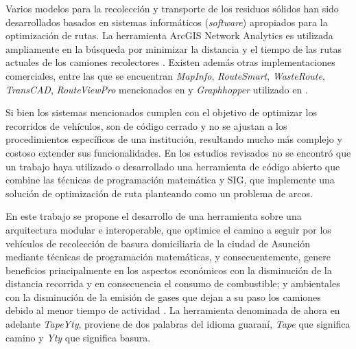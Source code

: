 


Varios modelos para la recolección y transporte de los residuos sólidos han sido desarrollados basados en sistemas informáticos (\textit{software}) apropiados para la optimización de rutas. La herramienta ArcGIS Network Analytics es utilizada ampliamente en la búsqueda por minimizar la distancia y el tiempo de las rutas actuales de los camiones recolectores \citep{Kallel2016UsingTunisia,Malakahmad2014SolidMalaysia}. Existen además otras implementaciones comerciales, entre las que se encuentran \textit{MapInfo}, \textit{RouteSmart}, \textit{WasteRoute}, \textit{TransCAD}, \textit{RouteViewPro} mencionados en \citet{Kallel2016UsingTunisia} y \textit{Graphhopper} utilizado en \citet{Lozano2018SmartOptimization}.

Si bien los sistemas mencionados cumplen con el objetivo de optimizar los recorridos de vehículos, son de código cerrado y no se ajustan a los procedimientos específicos de una institución, resultando mucho más complejo y costoso extender sus funcionalidades. En los estudios revisados no se encontró que un trabajo haya utilizado o desarrollado una herramienta de código abierto que combine las técnicas de programación matemática y SIG, que implemente una solución de optimización de ruta planteando como un problema de arcos. 

En este trabajo se propone el desarrollo de una herramienta sobre una arquitectura modular e interoperable, que optimice el camino a seguir por los vehículos de recolección de basura domiciliaria de la ciudad de Asunción mediante técnicas de programación matemáticas, y consecuentemente, genere beneficios principalmente en los aspectos económicos con la disminución de la distancia recorrida y en consecuencia el consumo de combustible; y ambientales con la disminución de la emisión de gases que dejan a su paso los camiones debido al menor tiempo de actividad \citep{Vu2018ParameterModel}. La herramienta denominada de ahora en adelante \textit{TapeYty}, proviene de dos palabras del idioma guaraní, \textit{Tape} que significa camino y \textit{Yty} que significa basura.

